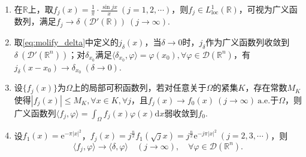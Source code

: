 \documentclass[../../main.tex]{subfiles}%
\begin{document}
\begin{examples}
\begin{enumerate}[(1)]
\item 在$\mathbb{R}$上，取$f_j(x)=\frac{1}{\pi}\cdot\frac{\sin jx}{x}\ (j=1,2,\cdots)$，则$f_j\in L^1_{\mathrm{loc}}(\mathbb{R})$，可视为广义函数列，满足$f_j\to\delta\ (\mathscr{D}'(\mathbb{R}))\ (j\to\infty)$.

\item 取\eqref{eq:molify_delta}中定义的$j_\delta(x)$，当$\delta\to0$时，$j_\delta$作为广义函数列收敛到$\delta\ (\mathscr{D}'(\mathbb{R}^n))$；对$\delta_{x_0}$满足$\langle\delta_{x_0},\varphi\rangle=\varphi(x_0),\forall\varphi\in\mathscr{D}(\mathbb{R}^n)$，有$j_\delta(x-x_0)\to\delta_{x_0}\ (\delta\to0)$.

\item 设$\{f_j(x)\}$为$\Omega$上的局部可积函数列，若对任意关于$\Omega$的紧集$K$，存在常数$M_K$使得$|f_j(x)|\leqslant M_K,\forall x\in K,\forall j$，且$f_j(x)\to f_0(x)\ (j\to\infty)\ \mathrm{a.e.}$于$\Omega$，则广义函数列$\langle f_j,\varphi\rangle=\int_{\Omega}f_j(x)\varphi(x)\mathrm{d}x$弱收敛到$f_0$.

\item 设$f_1(x)=\mathrm{e}^{-\pi|x|^2}$，$f_j(x)=j^{\frac{n}{2}}f_1(\sqrt{j}x)=j^{\frac{n}{2}}\mathrm{e}^{-j\pi|x|^2}\ (j=2,3,\cdots)$，则
$$\langle f_j,\varphi\rangle\to\langle\delta,\varphi\rangle\quad(j\to\infty),\quad\forall\varphi\in\mathscr{D}(\mathbb{R}^n).$$
\end{enumerate}
\end{examples}
\end{document}
